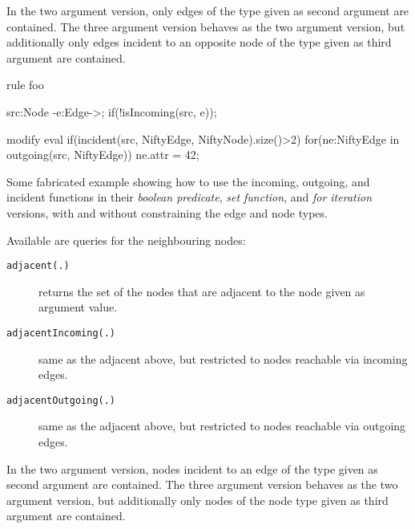 In the two argument version, only edges of the type given as second argument are contained.
The three argument version behaves as the two argument version, but additionally only edges incident to an opposite node of the type given as third argument are contained.

\begin{example}
\begin{grgen}
rule foo {
    src:Node -e:Edge->; 
    if(!isIncoming(src, e));
    
    modify {
        eval {
            if(incident(src, NiftyEdge, NiftyNode).size()>2)
            {
	              for(ne:NiftyEdge in outgoing(src, NiftyEdge))
	              {
	                  ne.attr = 42;
	              }
	          }
        }
    }
}
\end{grgen}
Some fabricated example showing how to use the incoming, outgoing, and incident functions in their \emph{boolean predicate}, \emph{set function}, and \emph{for iteration} versions, with and without constraining the edge and node types.
\end{example}

Available are queries for the neighbouring nodes:

\begin{description}
\item[\texttt{adjacent(.)}] returns the set of the nodes that are adjacent to the node given as argument value.
\item[\texttt{adjacentIncoming(.)}] same as the adjacent above, but restricted to nodes reachable via incoming edges.
\item[\texttt{adjacentOutgoing(.)}] same as the adjacent above, but restricted to nodes reachable via outgoing edges.
\end{description}

In the two argument version, nodes incident to an edge of the type given as second argument are contained.
The three argument version behaves as the two argument version, but additionally only nodes of the node type given as third argument are contained.

